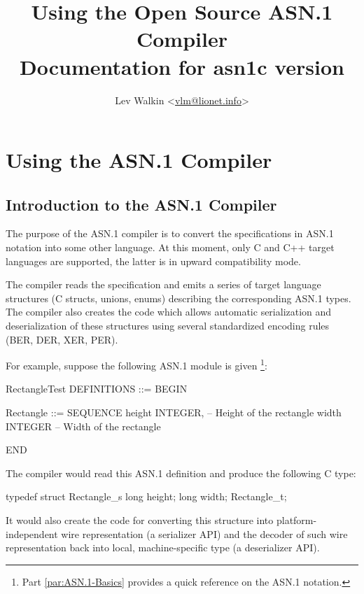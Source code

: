 \documentclass[english,oneside,12pt]{book}
\begin{document}
\title{Using the Open Source ASN.1 Compiler\\
\vspace*{1cm}
\Large Documentation for asn1c version \asnver{}}
\author{Lev Walkin <\href{mailto:vlm@lionet.info?Subject=asn1c}{vlm@lionet.info}>}

\pagestyle{fancy}
\fancyhead[L]{\leftmark}
\maketitle

\tableofcontents{}

\part{Using the ASN.1 Compiler}


\chapter{Introduction to the ASN.1 Compiler}

The purpose of the ASN.1 compiler is to convert the specifications
in ASN.1 notation into some other language. At this moment, only C
and C++ target languages are supported, the latter is in upward compatibility
mode.

The compiler reads the specification and emits a series of target
language structures (C structs, unions, enums) describing the corresponding
ASN.1 types. The compiler also creates the code which allows automatic
serialization and deserialization of these structures using several
standardized encoding rules (BER, DER, XER, PER).

For example, suppose the following ASN.1 module is given%
\footnote{Part \ref{par:ASN.1-Basics} provides a quick reference
on the ASN.1 notation.}:
\begin{asn}
RectangleTest DEFINITIONS ::= BEGIN

Rectangle ::= SEQUENCE {
    height  INTEGER,        -- Height of the rectangle
    width   INTEGER         -- Width of the rectangle
}

END
\end{asn}
The compiler would read this ASN.1 definition and produce the following
C type:
\begin{codesample}
typedef struct Rectangle_s {
    long height;
    long width;
} Rectangle_t;
\end{codesample}
It would also create the code for converting this structure into platform-independent
wire representation (a serializer API) and the decoder of such wire
representation back into local, machine-specific type (a deserializer
API).
\end{document}
